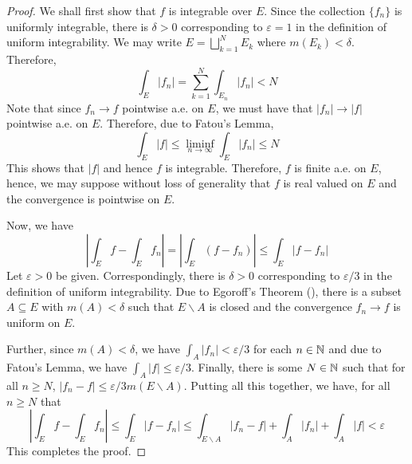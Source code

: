 \begin{proof}
    We shall first show that $f$ is integrable over $E$. Since the collection $\{f_n\}$ is uniformly integrable, there is $\delta > 0$ corresponding to $\varepsilon = 1$ in the definition of uniform integrability. We may write $E = \bigsqcup\limits_{k = 1}^N E_k$ where $m(E_k) < \delta$. Therefore, 
    \begin{equation*}
        \int_E|f_n| = \sum_{k = 1}^N\int_{E_n}|f_n| < N
    \end{equation*}
    Note that since $f_n\to f$ pointwise a.e. on $E$, we must have that $|f_n|\to|f|$ pointwise a.e. on $E$. Therefore, due to Fatou's Lemma,
    \begin{equation*}
        \int_E|f|\le\liminf_{n\to\infty}\int_E|f_n|\le N
    \end{equation*}
    This shows that $|f|$ and hence $f$ is integrable. Therefore, $f$ is finite a.e. on $E$, hence, we may suppose without loss of generality that $f$ is real valued on $E$ and the convergence is pointwise on $E$.

    Now, we have 
    \begin{equation*}
        \left|\int_E f - \int_E f_n\right|=\left|\int_E(f - f_n)\right|\le\int_E|f - f_n|
    \end{equation*}
    Let $\varepsilon > 0$ be given. Correspondingly, there is $\delta > 0$ corresponding to $\varepsilon/3$ in the definition of uniform integrability. Due to Egoroff's Theorem (), there is a subset $A\subseteq E$ with $m(A) < \delta$ such that $E\backslash A$ is closed and the convergence $f_n\to f$ is uniform on $E$. 

    Further, since $m(A) < \delta$, we have $\int_A|f_n| < \varepsilon/3$ for each $n\in\mathbb{N}$ and due to Fatou's Lemma, we have $\int_A|f|\le\varepsilon/3$. Finally, there is some $N\in\mathbb{N}$ such that for all $n\ge N$, $|f_n - f|\le\varepsilon/3m(E\backslash A)$. Putting all this together, we have, for all $n\ge N$ that 
    \begin{equation*}
        \left|\int_E f - \int_E f_n\right|\le\int_E|f - f_n|\le\int_{E\backslash A}|f_n - f| + \int_A |f_n| + \int_A |f| < \varepsilon
    \end{equation*}
    This completes the proof.
\end{proof}